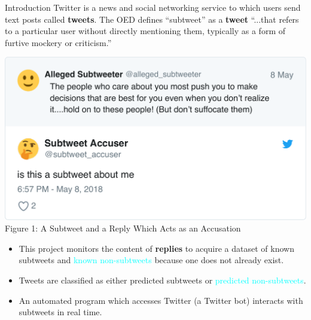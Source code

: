 \documentclass[12pt]{article}
\begin{document}
\begin{posterbard}



\begin{posterboxtitle}{Introduction} 
Twitter is a news and social networking service to which users send text posts called \textbf{tweets}. The OED defines \textcolor{WildStrawberry}{``subtweet''} as a \textbf{tweet} ``...that refers to a particular user without directly mentioning them, typically as a form of furtive mockery or criticism.''
\begin{center}
\includegraphics[width=\textwidth]{subtweet_example_1.pdf}\\
Figure 1: A Subtweet and a Reply Which Acts as an Accusation
\end{center}

\begin{itemize}
\item This project monitors the content of \textbf{replies} to acquire a dataset of \textcolor{WildStrawberry}{known subtweets} and \textcolor{Cyan}{known non-subtweets} because one does not already exist.
\item Tweets are classified as either \textcolor{WildStrawberry}{predicted subtweets} or \textcolor{Cyan}{predicted non-subtweets}.
\item An automated program which accesses Twitter (a Twitter bot) interacts with \textcolor{WildStrawberry}{subtweets} in real time.
\end{itemize}


\end{posterboxtitle}
\end{posterbard}
\end{document}

